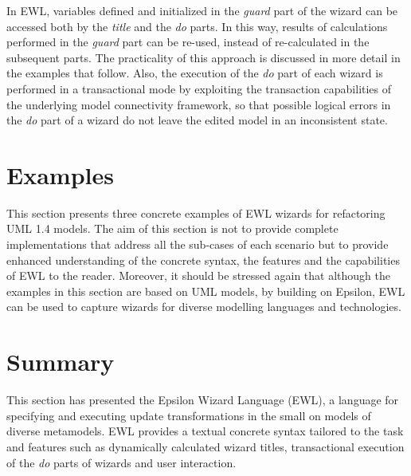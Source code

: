 In EWL, variables defined and initialized in the \emph{guard} part of the wizard can be accessed both by the \emph{title} and the \emph{do} parts. In this way, results of calculations performed in the \emph{guard} part can be re-used, instead of re-calculated in the subsequent parts.  The practicality of this approach is discussed in more detail in the examples that follow. Also, the execution of the \emph{do} part of each wizard is performed in a transactional mode by exploiting the transaction capabilities of the underlying model connectivity framework, so that possible logical errors in the \emph{do} part of a wizard do not leave the edited model in an inconsistent state. 

\section{Examples}
\label{sec:EwlExamples}

This section presents three concrete examples of EWL wizards for refactoring UML 1.4 models. The aim of this section is not to provide complete implementations that address all the sub-cases of each scenario but to provide enhanced understanding of the concrete syntax, the features and the capabilities of EWL to the reader. Moreover, it should be stressed again that although the examples in this section are based on UML models, by building on Epsilon, EWL can be used to capture wizards for diverse modelling languages and technologies.





\section{Summary}

This section has presented the Epsilon Wizard Language (EWL), a language for specifying and executing update transformations in the small on models of diverse metamodels. EWL provides a textual concrete syntax tailored to the task and features such as dynamically calculated wizard titles, transactional execution of the \emph{do} parts of wizards and user interaction.